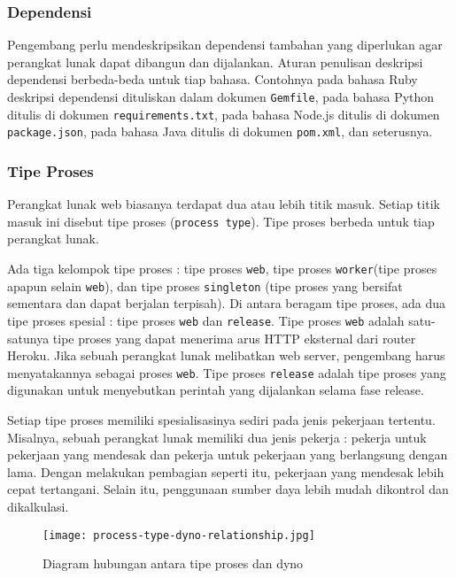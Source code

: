 \subsubsection{Dependensi}
Pengembang perlu mendeskripsikan dependensi tambahan yang diperlukan agar perangkat lunak dapat dibangun dan dijalankan. Aturan penulisan deskripsi dependensi berbeda-beda untuk tiap bahasa. Contohnya pada bahasa Ruby deskripsi dependensi dituliskan dalam dokumen \texttt{Gemfile}, pada bahasa Python ditulis di dokumen \texttt{requirements.txt}, pada bahasa Node.js ditulis di dokumen \texttt{package.json}, pada bahasa Java ditulis di dokumen \texttt{pom.xml}, dan seterusnya.

\subsubsection{Tipe Proses}
Perangkat lunak web biasanya terdapat dua atau lebih titik masuk. Setiap titik masuk ini disebut tipe proses (\texttt{process type}). Tipe proses berbeda untuk tiap perangkat lunak.

Ada tiga kelompok tipe proses : tipe proses \texttt{web}, tipe proses \texttt{worker}(tipe proses apapun selain \texttt{web}), dan tipe proses \texttt{singleton} (tipe proses yang bersifat sementara dan dapat berjalan terpisah). Di antara beragam tipe proses, ada dua tipe proses spesial : tipe proses \texttt{web} dan \texttt{release}. Tipe proses \texttt{web} adalah satu-satunya tipe proses yang dapat menerima arus HTTP eksternal dari router Heroku. Jika sebuah perangkat lunak melibatkan web server, pengembang harus menyatakannya sebagai proses \texttt{web}. Tipe proses \texttt{release} adalah tipe proses yang digunakan untuk menyebutkan perintah yang dijalankan selama fase release.

Setiap tipe proses memiliki spesialisasinya sediri pada jenis pekerjaan tertentu. Misalnya, sebuah perangkat lunak memiliki dua jenis pekerja : pekerja untuk pekerjaan yang mendesak dan pekerja untuk pekerjaan yang berlangsung dengan lama. Dengan melakukan pembagian seperti itu, pekerjaan yang mendesak lebih cepat tertangani. Selain itu, penggunaan sumber daya lebih mudah dikontrol dan dikalkulasi.

\begin{figure}[H]
	\centering  
	\texttt{[image: process-type-dyno-relationship.jpg]}  
	\caption[Diagram hubungan antara tipe proses dan dyno]{Diagram hubungan antara tipe proses dan dyno} 
	\label{fig:process-type-dyno-relationship} 
\end{figure}

